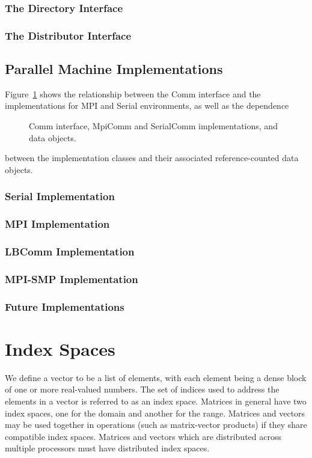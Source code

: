 \documentclass[10pt,relax]{PetraObjectModel}
\begin{document}
\subsubsection{The Directory Interface}
\subsubsection{The Distributor Interface}

\subsection{Parallel Machine Implementations}
Figure~\ref{commfigure} shows the relationship between the Comm interface and
the implementations for MPI and Serial environments, as well as the dependence
\begin{figure}[ht]
\begin{center}
\caption{Comm interface, MpiComm and SerialComm implementations, and data objects.}
\label{commfigure}
\end{center}
\end{figure}
between the implementation classes and their associated reference-counted
data objects.

\subsubsection{Serial Implementation}
\subsubsection{MPI Implementation}
\subsubsection{LBComm Implementation}
\subsubsection{MPI-SMP Implementation}
\subsubsection{Future Implementations}


\section{Index Spaces}
We define a vector to be a list of elements, with each element being a
dense block of one or more real-valued numbers. The set of indices used to
address the elements in a vector is referred to as an index space. Matrices
in general have two index spaces, one for the domain and another for the
range. Matrices and vectors may be used together in operations (such as
matrix-vector products) if they share compatible index spaces. Matrices
and vectors which are distributed across multiple processors must have
distributed index spaces.
\end{document}
